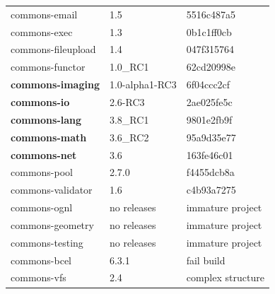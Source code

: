 \documentclass[sigconf,review,anonymous]{acmart}
\begin{document}
\begin{table}[t]
{\begin{tabular}{|l|l|l| }
    commons-email         & 1.5            		& 5516c487a5\\ %
    commons-exec          & 1.3            		& 0b1c1ff0cb\\ %
    commons-fileupload    & 1.4            		& 047f315764\\%
    commons-functor       & 1.0\_RC1       		& 62cd20998e\\ %
    \textbf{commons-imaging}       & 1.0-alpha1-RC3 & 6f04ccc2cf\\ %
    \textbf{commons-io}            & 2.6-RC3        & 2ae025fe5c\\ %
    \textbf{commons-lang}          & 3.8\_RC1   	& 9801e2fb9f\\ %
    \textbf{commons-math}          & 3.6\_RC2   & 95a9d35e77\\ %
    \textbf{commons-net}           & 3.6            	& 163fe46c01\\ %
    commons-pool          & 2.7.0          		& f4455dcb8a\\ %
    commons-validator     & 1.6            		& c4b93a7275\\ %
    \hline
    \hline 
    commons-ognl          & no releases    & immature project \\
    commons-geometry      & no releases    & immature project \\
    commons-testing       & no releases    & immature project \\
    \hline
    commons-bcel          & 6.3.1           & fail build \\
    commons-vfs           & 2.4             & complex structure \\ %

\end{tabular}}
\end{table}
\end{document}
